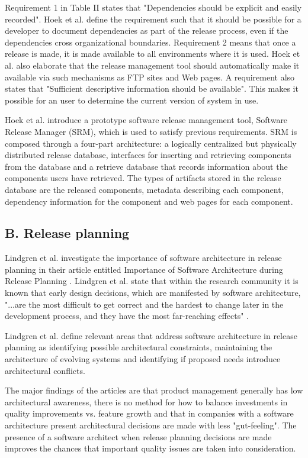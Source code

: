 \documentclass[conference]{IEEEtran}
\begin{document}
Requirement 1 in Table II states that "Dependencies should be explicit and easily recorded". Hoek et al. define the requirement such that it should be possible for a developer to document dependencies as part of the release process, even if the dependencies cross organizational boundaries. Requirement 2 means that once a release is made, it is made available to all environments where it is used. Hoek et al. also elaborate that the release management tool should automatically make it available via such mechanisms as FTP sites and Web pages. A requirement also states that "Sufficient descriptive information should be available". This makes it possible for an user to determine the current version of system in use.

Hoek et al. introduce a prototype software release management tool, Software Release Manager (SRM), which is used to satisfy previous requirements. SRM is composed through a four-part architecture: a logically centralized but physically distributed release database, interfaces for inserting and retrieving components from the database and a retrieve database that records information about the components users have retrieved. The types of artifacts stored in the release database are the released components, metadata describing each component, dependency information for the component and web pages for each component. 

\subsection{B. Release planning}

Lindgren et al. investigate the importance of software architecture in release planning in their article entitled Importance of Software Architecture during Release Planning \cite{lindgren2008importance}. Lindgren et al. state that within the research community it is known that early design decisions, which are manifested by software architecture, "...are the most difficult to get correct and the hardest to change later in the development process, and they have the most far-reaching effects" \cite{bass2003software}.

Lindgren et al. define relevant areas that address software architecture in release planning as identifying possible architectural constraints, maintaining the architecture of evolving systems and identifying if proposed needs introduce architectural conflicts. 

The major findings of the articles are that product management generally has low architectural awareness, there is no method for how to balance investments in quality improvements vs. feature growth and that in companies with a software architecture present architectural decisions are made with less "gut-feeling". The presence of a software architect when release planning decisions are made improves the chances that important quality issues are taken into consideration.
\end{document}
